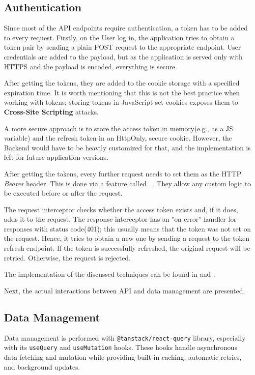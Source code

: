 \subsection{Authentication}
Since most of the API endpoints require authentication, a token has to be added to every
request. Firstly, on the User log in, the application tries to obtain a token pair by sending
a plain POST request to the appropriate endpoint. User credentials are added to the payload,
but as the application is served only with HTTPS and the payload is encoded, everything is secure.

After getting the tokens, they are added to the cookie storage with a specified expiration time.
It is worth mentioning that this is not the best practice when
working with tokens; storing tokens in JavaScript-set
cookies exposes them to \textbf{Cross-Site Scripting} attacks.

A more secure approach is to store the access token in memory(e.g., as a JS variable) and the
refresh token in an HttpOnly, secure cookie. However, the Backend would have to be heavily customized for that, and
the implementation is left for future application versions.

After getting the tokens, every further request needs to set them as the HTTP \textit{Bearer} header.
This is done via a feature called ~\cite{axiosintercept}.
They allow any custom logic to be executed before or after the request.

The request interceptor checks whether the access token exists and, if it does, adds it to the request.
The response interceptor has an "on error" handler for responses with  status code(401); this usually means that the token was not set on the request. Hence, it tries to obtain a new one
by sending a request to the token refresh endpoint. If the token is successfully refreshed, the original request will be
retried. Otherwise, the request is rejected.

The implementation of the discussed techniques can be found in 
and .

Next, the actual interactions between API and data management are presented.

\subsection{Data Management}
Data management is performed with \texttt{@tanstack/react-query} library, especially with its
\texttt{useQuery} and \texttt{useMutation} hooks. These hooks handle asynchronous data
fetching and mutation while providing built-in caching,
automatic retries, and background updates.

